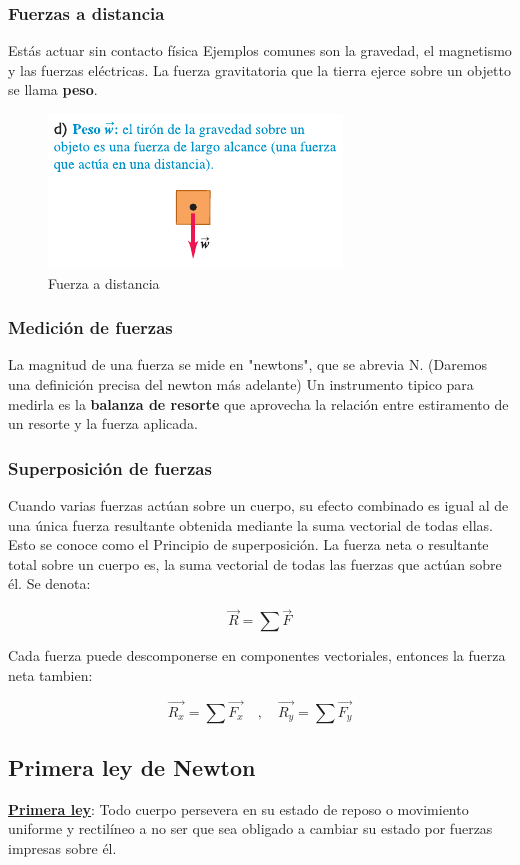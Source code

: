 \documentclass{article}
\newcommand{\newsubsection}[1]{
    \vspace{0.5cm}
    \color{sectionColor}
    \subsection{\bl{#1}}
    \color{black}
    \vspace{0.5cm}
}
\newcommand{\newtitle}[1]{
    \color{titleColor}
    \subsubsection{#1}
    \color{black}
}
\newcommand{\bl}[1]{\textbf{#1}}
\newcommand{\definicion}[1]{%
    \vspace{0.5cm}
    \begin{definicionbox}
        #1
    \end{definicionbox}
    \vspace{0.5cm}
}
\begin{document}
    \newtitle{Fuerzas a distancia}
        \par Estás actuar sin contacto física Ejemplos comunes son la gravedad, el magnetismo y las fuerzas eléctricas. La fuerza gravitatoria que la tierra ejerce sobre un objetto se llama \bl{peso}.
        \begin{figure}[H]
            \centering
            \includegraphics[scale=0.8]{img/2.1-4.png}
            \caption{Fuerza a distancia}
            \label{fig:Fuerza a distancia}
        \end{figure}

    \newtitle{Medición de fuerzas}

        \par La magnitud de una fuerza se mide en "newtons", que se abrevia N. (Daremos una definición precisa del newton más adelante) Un instrumento tipico para medirla es la \bl{balanza de resorte} que aprovecha la relación entre estiramento de un resorte y la fuerza aplicada.

    \newtitle{Superposición de fuerzas}

        \par Cuando varias fuerzas actúan sobre un cuerpo, su efecto combinado es igual al de una única fuerza resultante obtenida mediante la suma vectorial de todas ellas. Esto se conoce como el Principio de superposición. La fuerza neta o resultante total sobre un cuerpo es, la suma vectorial de todas las fuerzas que actúan sobre él. Se denota:
        
        \[\vec{R} = \sum \vec{F}\]

        \par Cada fuerza puede descomponerse en componentes vectoriales, entonces la fuerza neta tambien:

        \[\vec{R_x} = \sum \vec{F_x} \quad , \quad \vec{R_y} = \sum \vec{F_y}\]

    \newsubsection{Primera ley de Newton}

    \definicion{
        \par \color{blue}\underline{\bl{Primera ley}}\color{black}: Todo cuerpo persevera en su estado de reposo o movimiento uniforme y rectilíneo a no ser que sea obligado a cambiar su estado por fuerzas impresas sobre él. 
    }
\end{document}
